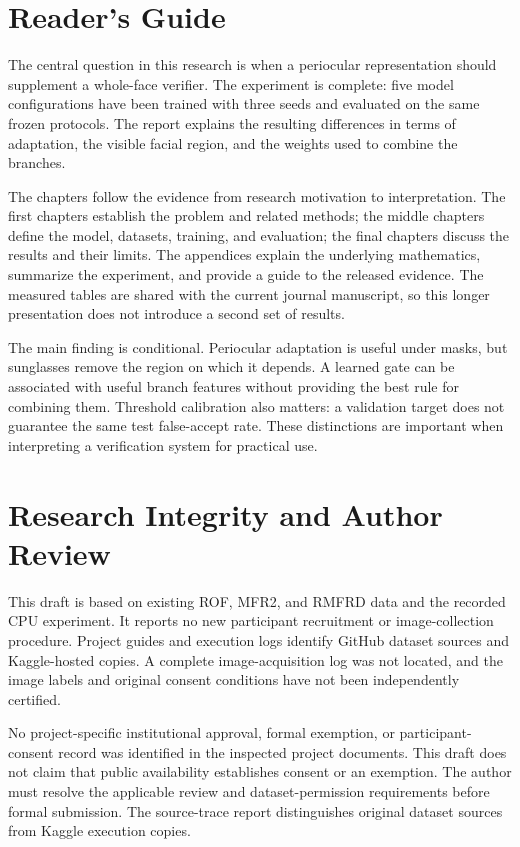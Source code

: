 \documentclass[12pt,a4paper,oneside]{report}
\begin{document}
\chapter*{Reader's Guide}
The central question in this research is when a periocular representation should supplement a whole-face verifier. The experiment is complete: five model configurations have been trained with three seeds and evaluated on the same frozen protocols. The report explains the resulting differences in terms of adaptation, the visible facial region, and the weights used to combine the branches.

The chapters follow the evidence from research motivation to interpretation. The first chapters establish the problem and related methods; the middle chapters define the model, datasets, training, and evaluation; the final chapters discuss the results and their limits. The appendices explain the underlying mathematics, summarize the experiment, and provide a guide to the released evidence. The measured tables are shared with the current journal manuscript, so this longer presentation does not introduce a second set of results.

The main finding is conditional. Periocular adaptation is useful under masks, but sunglasses remove the region on which it depends. A learned gate can be associated with useful branch features without providing the best rule for combining them. Threshold calibration also matters: a validation target does not guarantee the same test false-accept rate. These distinctions are important when interpreting a verification system for practical use.

\chapter*{Research Integrity and Author Review}
This draft is based on existing ROF, MFR2, and RMFRD data and the recorded CPU experiment. It reports no new participant recruitment or image-collection procedure. Project guides and execution logs identify GitHub dataset sources and Kaggle-hosted copies. A complete image-acquisition log was not located, and the image labels and original consent conditions have not been independently certified.

No project-specific institutional approval, formal exemption, or participant-consent record was identified in the inspected project documents. This draft does not claim that public availability establishes consent or an exemption. The author must resolve the applicable review and dataset-permission requirements before formal submission. The source-trace report distinguishes original dataset sources from Kaggle execution copies.
\end{document}
